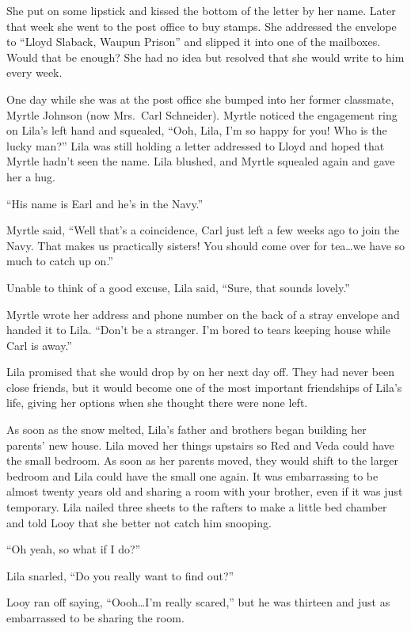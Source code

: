 \documentclass[
  american,
  letterpaper,
]{book}
\newcounter{none} %
\begin{document}
She put on some lipstick and kissed the bottom of the letter by her
name. Later that week she went to the post office to buy stamps. She
addressed the envelope to ``Lloyd Slaback, Waupun Prison'' and slipped
it into one of the mailboxes. Would that be enough? She had no idea but
resolved that she would write to him every week.

One day while she was at the post office she bumped into her former
classmate, Myrtle Johnson (now Mrs.~Carl Schneider). Myrtle noticed the
engagement ring on Lila's left hand and squealed, ``Ooh, Lila, I'm so
happy for you! Who is the lucky man?'' Lila was still holding a letter
addressed to Lloyd and hoped that Myrtle hadn't seen the name. Lila
blushed, and Myrtle squealed again and gave her a hug.

``His name is Earl and he's in the Navy.''

Myrtle said, ``Well that's a coincidence, Carl just left a few weeks ago
to join the Navy. That makes us practically sisters! You should come
over for tea\ldots we have so much to catch up on.''

Unable to think of a good excuse, Lila said, ``Sure, that sounds
lovely.''

Myrtle wrote her address and phone number on the back of a stray
envelope and handed it to Lila. ``Don't be a stranger. I'm bored to
tears keeping house while Carl is away.''

Lila promised that she would drop by on her next day off. They had never
been close friends, but it would become one of the most important
friendships of Lila's life, giving her options when she thought there
were none left.

As soon as the snow melted, Lila's father and brothers began building
her parents' new house. Lila moved her things upstairs so Red and Veda
could have the small bedroom. As soon as her parents moved, they would
shift to the larger bedroom and Lila could have the small one again. It
was embarrassing to be almost twenty years old and sharing a room with
your brother, even if it was just temporary. Lila nailed three sheets to
the rafters to make a little bed chamber and told Looy that she better
not catch him snooping.

``Oh yeah, so what if I do?''

Lila snarled, ``Do you really want to find out?''

Looy ran off saying, ``Oooh\ldots I'm really scared,'' but he was
thirteen and just as embarrassed to be sharing the room.
\end{document}
